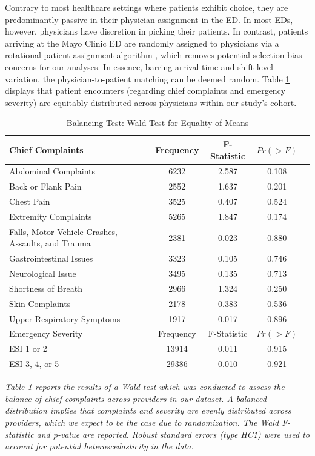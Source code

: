 \documentclass[,,nonblindrev]{informs}
\begin{document}
Contrary to most healthcare settings where patients exhibit choice, they
are predominantly passive in their physician assignment in the ED. In
most EDs, however, physicians have discretion in picking their patients.
In contrast, patients arriving at the Mayo Clinic ED are randomly
assigned to physicians via a rotational patient assignment algorithm
\citet{traub2016emergency}, which removes potential selection bias
concerns for our analyses. In essence, barring arrival time and
shift-level variation, the physician-to-patient matching can be deemed
random. Table \ref{tab:wald_test} displays that patient encounters
(regarding chief complaints and emergency severity) are equitably
distributed across physicians within our study's cohort.

\begin{table}[htbp]
    \centering
    \caption{Balancing Test: Wald Test for Equality of Means}
    \label{tab:wald_test}
    \begin{tabular}{p{10cm}cccc}
        \toprule
        Chief Complaints & Frequency & F-Statistic & $Pr(> F)$ \\
        \midrule
        Abdominal Complaints & 6232 & 2.587 & 0.108 \\ 
        Back or Flank Pain & 2552 & 1.637 & 0.201 \\ 
        Chest Pain & 3525 & 0.407 & 0.524 \\ 
        Extremity Complaints & 5265 & 1.847 & 0.174 \\ 
        Falls, Motor Vehicle Crashes, Assaults, and Trauma & 2381 & 0.023 & 0.880 \\ 
        Gastrointestinal Issues & 3323 & 0.105 & 0.746 \\ 
        Neurological Issue & 3495 & 0.135 & 0.713 \\ 
        Shortness of Breath & 2966 & 1.324 & 0.250 \\ 
        Skin Complaints & 2178 & 0.383 & 0.536 \\ 
        Upper Respiratory Symptoms & 1917 & 0.017 & 0.896 \\ 
        \midrule
        Emergency Severity & Frequency & F-Statistic & $Pr(> F)$ \\
        \midrule
        ESI 1 or 2 & 13914 & 0.011 & 0.915 \\ 
        ESI 3, 4, or 5 & 29386 & 0.010 & 0.921 \\ 
        \bottomrule
    \end{tabular}
\begin{tablenotes}
\small
\item \textit{Table \ref{tab:wald_test} reports the results of a Wald test which was conducted to assess the balance of chief complaints across providers in our dataset. A balanced distribution implies that complaints and severity are evenly distributed across providers, which we expect to be the case due to randomization. The Wald F-statistic and p-value are reported. Robust standard errors (type HC1) were used to account for potential heteroscedasticity in the data.}
\end{tablenotes}
\end{table}
\end{document}
